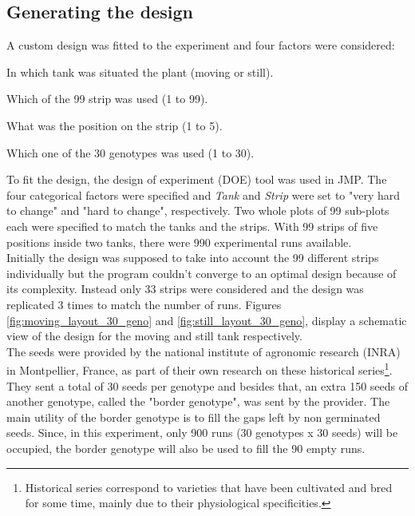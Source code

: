 \subsection{Generating the design}
A custom design was fitted to the experiment and four factors were considered:
\begin{description}[align=left]
\item [Tank] In which tank was situated the plant (moving or still).
\item [Strip] Which of the 99 strip was used (1 to 99).
\item [Position] What was the position on the strip (1 to 5).
\item [Genotype] Which one of the 30 genotypes was used (1 to 30).
\end{description}
To fit the design, the design of experiment (DOE) tool was used in JMP. The four categorical factors were specified and \textit{Tank} and \textit{Strip} were set to "very hard to change" and "hard to change", respectively. Two whole plots of 99 sub-plots each were specified to match the tanks and the strips. With 99 strips of five positions inside two tanks, there were 990 experimental runs available.\\
Initially the design was supposed to take into account the 99 different strips individually but the program couldn't converge to an optimal design because of its complexity. Instead only 33 strips were considered and the design was replicated 3 times to match the number of runs. Figures \ref{fig:moving_layout_30_geno} and \ref{fig:still_layout_30_geno}, display a schematic view of the design for the moving and still tank respectively.\\
The seeds were provided by the national institute of agronomic research (INRA) in Montpellier, France, as part of their own research on these historical series\footnote{Historical series correspond to varieties that have been cultivated and bred for some time, mainly due to their physiological specificities.}. They sent a total of 30 seeds per genotype and besides that, an extra 150 seeds of another genotype, called the "border genotype", was sent by the provider. The main utility of the border genotype is to fill the gaps left by non germinated seeds. Since, in this experiment, only 900 runs (30 genotypes x 30 seeds) will be occupied, the border genotype will also be used to fill the 90 empty runs.

